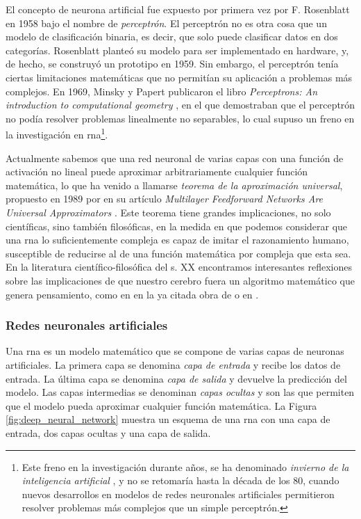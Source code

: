 El concepto de neurona artificial fue expuesto por primera vez por F. Rosenblatt en 1958 \citep{rothmanTransformersNaturalLanguage2021} bajo el nombre de \emph{perceptrón}. El perceptrón no es otra cosa que un modelo de clasificación binaria, es decir, que solo puede clasificar datos en dos categorías. Rosenblatt planteó su modelo para ser implementado en hardware, y, de hecho, se construyó un prototipo en 1959. Sin embargo, el perceptrón tenía ciertas limitaciones matemáticas que no permitían su aplicación a problemas más complejos. En 1969, Minsky y Papert publicaron el libro \emph{Perceptrons: An introduction to computational geometry} \citep{minsky1969perceptrons}, en el que demostraban que el perceptrón no podía resolver problemas linealmente no separables, lo cual supuso un freno en la investigación en \gls{rna}\footnote{Este freno en la investigación durante años, se ha denominado \emph{invierno de la inteligencia artificial} \citep{InviernoIA2023}, y no se retomaría hasta la década de los 80, cuando nuevos desarrollos en modelos de redes neuronales artificiales permitieron resolver problemas más complejos que un simple perceptrón.}.

Actualmente sabemos que una red neuronal de varias capas con una función de activación no lineal puede aproximar arbitrariamente cualquier función matemática, lo que ha venido a llamarse \emph{teorema de la aproximación universal}, propuesto en 1989 por \citeauthor{hornikMultilayerFeedforwardNetworks1989} en su artículo \emph{Multilayer Feedforward Networks Are Universal Approximators} \citep{hornikMultilayerFeedforwardNetworks1989}. Este teorema tiene grandes implicaciones, no solo científicas, sino también filosóficas, en la medida en que podemos considerar que una \gls{rna} lo suficientemente compleja es capaz de imitar el razonamiento humano, susceptible de reducirse al de una función matemática por compleja que esta sea. En la literatura científico-filosófica del s. XX encontramos interesantes reflexiones sobre las implicaciones de que nuestro cerebro fuera un algoritmo matemático que genera pensamiento, como en en la ya citada obra de \cite{penroseNuevaMenteEmperador2015} o en \cite{searleMentesCerebrosCiencia1985}.


\subsubsection{Redes neuronales artificiales}
Una \gls{rna} es un modelo matemático que se compone de varias capas de neuronas artificiales. La primera capa se denomina \emph{capa de entrada} y recibe los datos de entrada. La última capa se denomina \emph{capa de salida} y devuelve la predicción del modelo. Las capas intermedias se denominan \emph{capas ocultas} y son las que permiten que el modelo pueda aproximar cualquier función matemática. La Figura \ref{fig:deep_neural_network} muestra un esquema de una \gls{rna} con una capa de entrada, dos capas ocultas y una capa de salida.

